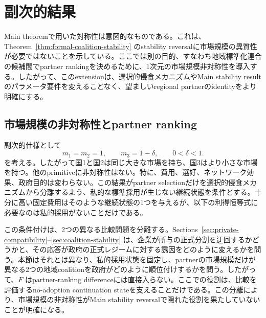 \section{副次的結果}
\label{sec:secondary}

Main theoremで用いた対称性は意図的なものである。これは、Theorem~\ref{thm:formal-coalition-stability} のstability reversalに市場規模の異質性が必要ではないことを示している。ここでは別の目的、すなわち地域標準化連合の候補間でpartner rankingを決めるために、1次元の市場規模非対称性を導入する。したがって、このextensionは、選択的侵食メカニズムやMain stability resultのパラメータ要件を変えることなく、望ましいregional partnerのidentityをより明確にする。

\subsection{市場規模の非対称性とpartner ranking}
\label{subsec:market-size-partner-ranking}

副次的仕様として
\begin{equation}
    m_1=m_2=1,
    \qquad
    m_3=1-\delta,
    \qquad
    0<\delta<1.
    \label{eq:secondary-market-sizes}
\end{equation}
を考える。したがって国1と国2は同じ大きな市場を持ち、国3はより小さな市場を持つ。他のprimitiveに非対称性はない。特に、費用、選好、ネットワーク効果、政府目的は変わらない。この結果がpartner selectionだけを選択的侵食メカニズムから分離するよう、私的な標準採用が生じない継続状態を条件とする。十分に高い固定費用はそのような継続状態の1つを与えるが、以下の利得恒等式に必要なのは私的採用がないことだけである。

この条件付けは、2つの異なる比較問題を分離する。Sections~\ref{sec:private-compatibility}--\ref{sec:coalition-stability} は、企業が所与の正式分割を迂回するかどうかと、その応答が政府の正式レジームに対する誘因をどのように変えるかを問う。本節はそれとは異なり、私的採用状態を固定し、partnerの市場規模だけが異なる2つの地域coalitionを政府がどのように順位付けするかを問う。したがって、$F$ はpartner-ranking differenceには直接入らない。ここでの役割は、比較を評価するno-adoption continuation stateを支えることだけである。この分離により、市場規模の非対称性がMain stability reversalで隠れた役割を果たしていないことが明確になる。

